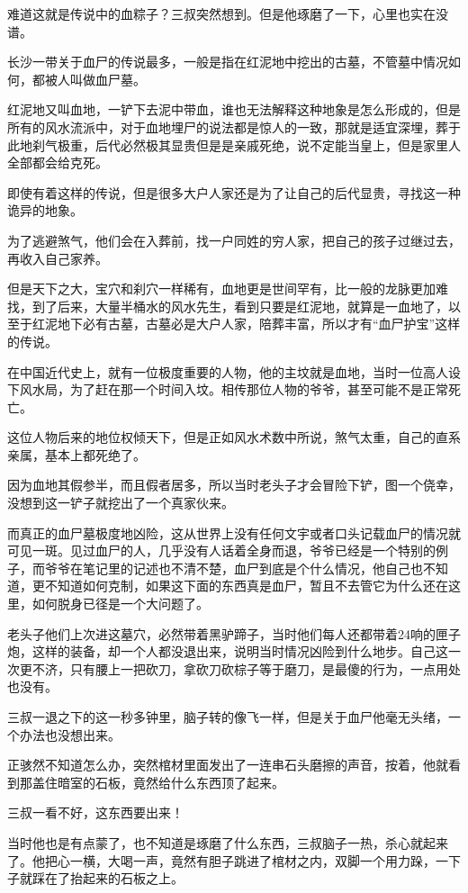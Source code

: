 难道这就是传说中的血粽子？三叔突然想到。但是他琢磨了一下，心里也实在没谱。

长沙一带关于血尸的传说最多，一般是指在红泥地中挖出的古墓，不管墓中情况如何，都被人叫做血尸墓。

红泥地又叫血地，一铲下去泥中带血，谁也无法解释这种地象是怎么形成的，但是所有的风水流派中，对于血地埋尸的说法都是惊人的一致，那就是适宜深埋，葬于此地刹气极重，后代必然极其显贵但是是亲戚死绝，说不定能当皇上，但是家里人全部都会给克死。

即使有着这样的传说，但是很多大户人家还是为了让自己的后代显贵，寻找这一种诡异的地象。

为了逃避煞气，他们会在入葬前，找一户同姓的穷人家，把自己的孩子过继过去，再收入自己家养。

但是天下之大，宝穴和刹穴一样稀有，血地更是世间罕有，比一般的龙脉更加难找，到了后来，大量半桶水的风水先生，看到只要是红泥地，就算是一血地了，以至于红泥地下必有古墓，古墓必是大户人家，陪葬丰富，所以才有“血尸护宝”这样的传说。

在中国近代史上，就有一位极度重要的人物，他的主坟就是血地，当时一位高人设下风水局，为了赶在那一个时间入坟。相传那位人物的爷爷，甚至可能不是正常死亡。

这位人物后来的地位权倾天下，但是正如风水术数中所说，煞气太重，自己的直系亲属，基本上都死绝了。

因为血地其假参半，而且假者居多，所以当时老头子才会冒险下铲，图一个侥幸，没想到这一铲子就挖出了一个真家伙来。

而真正的血尸墓极度地凶险，这从世界上没有任何文宇或者口头记载血尸的情况就可见一斑。见过血尸的人，几乎没有人话着全身而退，爷爷已经是一个特别的例子，而爷爷在笔记里的记述也不清不楚，血尸到底是个什么情况，他自己也不知道，更不知道如何克制，如果这下面的东西真是血尸，暂且不去管它为什么还在这里，如何脱身已径是一个大问题了。

老头子他们上次进这墓穴，必然带着黑驴蹄子，当时他们每人还都带着24响的匣子炮，这样的装备，却一个人都没退出来，说明当时情况凶险到什么地步。自己这一次更不济，只有腰上一把砍刀，拿砍刀砍棕子等于磨刀，是最傻的行为，一点用处也没有。

三叔一退之下的这一秒多钟里，脑子转的像飞一样，但是关于血尸他毫无头绪，一个办法也没想出来。

正骇然不知道怎么办，突然棺材里面发出了一连串石头磨擦的声音，按着，他就看到那盖住暗室的石板，竟然给什么东西顶了起来。

三叔一看不好，这东西要出来！

当时他也是有点蒙了，也不知道是琢磨了什么东西，三叔脑子一热，杀心就起来了。他把心一横，大喝一声，竟然有胆子跳进了棺材之内，双脚一个用力跺，一下子就踩在了抬起来的石板之上。

